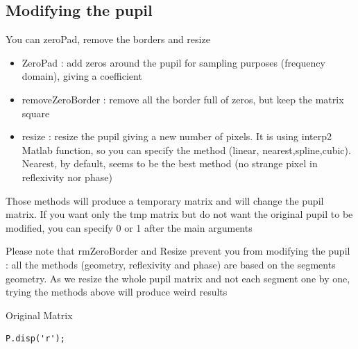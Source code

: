 \documentclass[12pt]{article}
\begin{document}
\subsection*{Modifying the pupil}

\begin{par}
You can zeroPad, remove the borders and resize
\end{par} \vspace{1em}
\begin{itemize}
\setlength{\itemsep}{-1ex}
   \item ZeroPad : add zeros around the pupil for sampling purposes (frequency domain), giving  a coefficient
\end{itemize}
\begin{itemize}
\setlength{\itemsep}{-1ex}
   \item removeZeroBorder : remove all the border full of zeros, but keep the matrix square
\end{itemize}
\begin{itemize}
\setlength{\itemsep}{-1ex}
   \item resize : resize the pupil giving a new number of pixels. It is using interp2 Matlab function, so you can specify the method (linear, nearest,spline,cubic). Nearest, by default, seems to be the best method (no strange pixel in reflexivity nor phase)
\end{itemize}
\begin{par}
Those methods will produce a temporary matrix and will change the pupil matrix. If you want only the tmp matrix but do not want the original pupil to be modified, you can specify 0 or 1 after the main arguments
\end{par} \vspace{1em}
\begin{par}
Please note that rmZeroBorder and Resize prevent you from modifying the pupil : all the methods (geometry, reflexivity and phase) are based on the segments geometry. As we resize the whole pupil matrix and not each segment one by one, trying the methods above will produce weird results
\end{par} \vspace{1em}
\begin{par}
Original Matrix
\end{par} \vspace{1em}
\begin{verbatim}
P.disp('r');
\end{verbatim}
\end{document}
